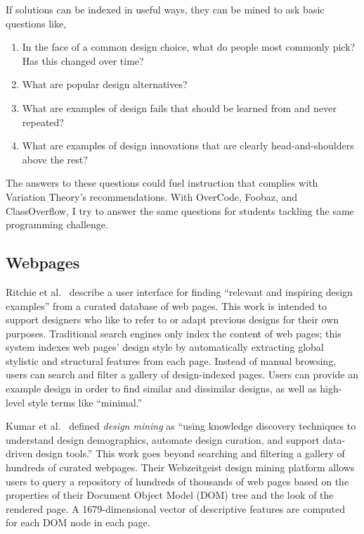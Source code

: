 If solutions can be indexed in useful ways, they can be mined to ask basic questions like,
\begin{enumerate}
\item    In the face of a common design choice, what do people most commonly pick? Has this changed over time?
\item    What are popular design alternatives?
\item    What are examples of design fails that should be learned from and never repeated?
\item    What are examples of design innovations that are clearly head-and-shoulders above the rest?
\end{enumerate}
The answers to these questions could fuel instruction that complies with Variation Theory's recommendations. With OverCode, Foobaz, and ClassOverflow, I try to answer the same questions for students tackling the same programming challenge.

\subsection{Webpages}
Ritchie et al.~\cite{ritchie2011d} describe a user interface for finding “relevant and inspiring design examples” from a curated database of web pages. This work is intended to support designers who like to refer to or adapt previous designs for their own purposes. Traditional search engines only index the content of web pages; this system indexes web pages’ design style by automatically extracting global stylistic and structural features from each page. Instead of manual browsing, users can search and filter a gallery of design-indexed pages. Users can provide an example design in order to find similar and dissimilar designs, as well as high-level style terms like “minimal.”

Kumar et al.~\cite{webzeitgeist} defined {\it design mining} as “using knowledge discovery techniques to understand design demographics, automate design curation, and support data-driven design tools.” This work goes beyond searching and filtering a gallery of hundreds of curated webpages. Their Webzeitgeist design mining platform allows users to query a repository of hundreds of thousands of web pages based on the properties of their Document Object Model (DOM) tree and the look of the rendered page. A 1679-dimensional vector of descriptive features are computed for each DOM node in each page.

